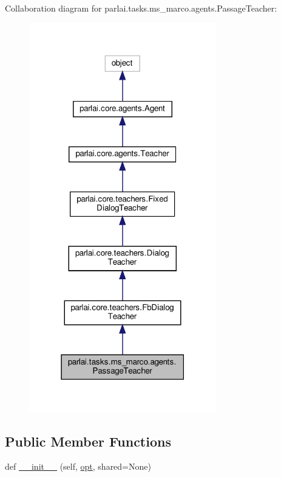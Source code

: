 Collaboration diagram for parlai.\+tasks.\+ms\+\_\+marco.\+agents.\+Passage\+Teacher\+:
\nopagebreak
\begin{figure}[H]
\begin{center}
\leavevmode
\includegraphics[width=231pt]{d7/df7/classparlai_1_1tasks_1_1ms__marco_1_1agents_1_1PassageTeacher__coll__graph}
\end{center}
\end{figure}
\subsection*{Public Member Functions}
\begin{DoxyCompactItemize}
\item 
def \hyperlink{classparlai_1_1tasks_1_1ms__marco_1_1agents_1_1PassageTeacher_a94976bd31fa3b9da0ea1c7625b22c382}{\+\_\+\+\_\+init\+\_\+\+\_\+} (self, \hyperlink{classparlai_1_1core_1_1teachers_1_1FbDialogTeacher_af7a9ec497b9cd0292d7b8fa220da7c28}{opt}, shared=None)
\end{DoxyCompactItemize}

